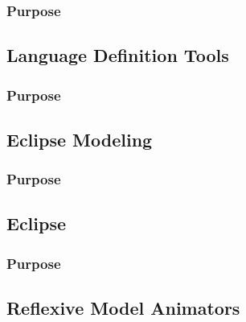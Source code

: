 \documentclass{gemoc} %
\begin{document}

\subsubsection{Purpose}



\subsection{Language Definition Tools}


\subsubsection{Purpose}



\subsection{Eclipse Modeling}


\subsubsection{Purpose}



\subsection{Eclipse}


\subsubsection{Purpose}



\subsection{Reflexive Model Animators}
\end{document}
